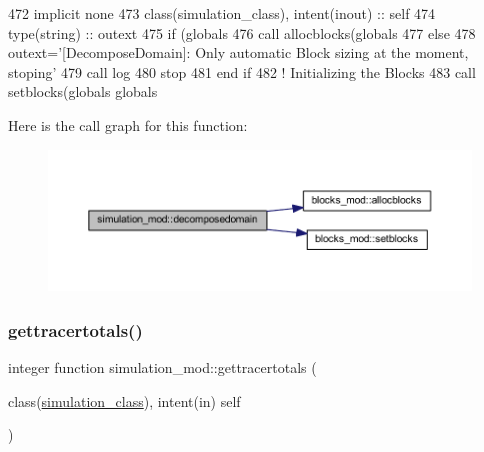 \begin{DoxyCode}
472     \textcolor{keywordtype}{implicit none}
473     \textcolor{keywordtype}{class}(simulation\_class), \textcolor{keywordtype}{intent(inout)} :: self
474     \textcolor{keywordtype}{type}(string) :: outext
475     \textcolor{keywordflow}{if} (globals%
476         \textcolor{keyword}{call }allocblocks(globals%
477     \textcolor{keywordflow}{else}
478         outext=\textcolor{stringliteral}{'[DecomposeDomain]: Only automatic Block sizing at the moment, stoping'}
479         \textcolor{keyword}{call }log%
480         stop
481 \textcolor{keywordflow}{    end if}
482     \textcolor{comment}{! Initializing the Blocks}
483     \textcolor{keyword}{call }setblocks(globals%
      globals%
\end{DoxyCode}
Here is the call graph for this function\+:\nopagebreak
\begin{figure}[H]
\begin{center}
\leavevmode
\includegraphics[width=350pt]{namespacesimulation__mod_a2b8198a9fb3f7671c6b45192a0b9740c_cgraph}
\end{center}
\end{figure}
\mbox{\label{namespacesimulation__mod_a0ad485eab624ffa4df282f1da8d9f214}} 
\subsubsection{\texorpdfstring{gettracertotals()}{gettracertotals()}}
{\footnotesize\ttfamily integer function simulation\+\_\+mod\+::gettracertotals (\begin{DoxyParamCaption}\item[{class(\mbox{\hyperlink{structsimulation__mod_1_1simulation__class}{simulation\+\_\+class}}), intent(in)}]{self }\end{DoxyParamCaption})\hspace{0.3cm}{\ttfamily [private]}}



